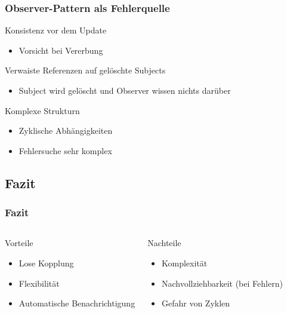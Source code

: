 \begin{frame}
\frametitle{Observer-Pattern als Fehlerquelle}
		\begin{block}{Konsistenz vor dem Update}
			\begin{itemize}
  				\item Vorsicht bei Vererbung
  			\end{itemize}  
  		\end{block}		
	\begin{block}{Verwaiste Referenzen auf gelöschte Subjects}
			\begin{itemize}
  				\item Subject wird gelöscht und Observer wissen nichts darüber
  			\end{itemize}  
  		\end{block}	
  		\begin{block}{Komplexe Strukturn}
			\begin{itemize}
  				\item Zyklische Abhängigkeiten
  				\item Fehlersuche sehr komplex
  			\end{itemize}  
  		\end{block}	
		
\end{frame}


\subsection{Fazit}
\begin{frame}
	\frametitle{Fazit}
	\begin{columns} 
    		\begin{exampleblock}{Vorteile}
    			\begin{itemize}
    				\item Lose Kopplung
    				\item Flexibilität
    				\item Automatische Benachrichtigung
    			\end{itemize}
    		\end{exampleblock}
    		\begin{alertblock}{Nachteile}
    			\begin{itemize}
    				\item Komplexität
    				\item Nachvollziehbarkeit (bei Fehlern)
    				\item Gefahr von Zyklen
    			\end{itemize}
    		\end{alertblock}
  	\end{columns}   	  		
\end{frame}
